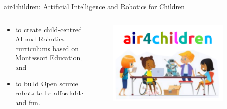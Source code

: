 {
\begin{frame}{
air4children: Artificial Intelligence and Robotics for Children  
}

  \begin{columns}
  \begin{column}{.7\linewidth}

  \begin{itemize}
    \item to create child-centred AI and Robotics curriculums based on Montessori Education, and
    \item to build Open source robots to be affordable and fun. 
  \end{itemize}

    \end{column}


  \begin{column}{.4\linewidth}

      \begin{figure}
        \centering
        \includegraphics[width=0.95\textwidth]{./figures/logo/outputs/drawing-v00.png}
      \end{figure}

    \end{column}
  \end{columns}

\end{frame}
}




